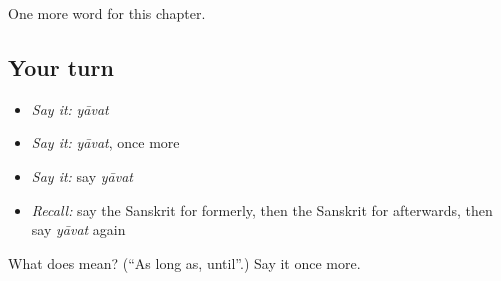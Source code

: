 \begin{grammarlens}[title={What you've built}]
One more word for this chapter.
\end{grammarlens}

\subsection*{Your turn}
\begin{itemize}
\raggedright
  \item \emph{Say it:} \emph{yāvat}
  \item \emph{Say it:} \emph{yāvat}, once more
  \item \emph{Say it:} say \emph{yāvat}
  \item \emph{Recall:} say the Sanskrit for formerly, then the Sanskrit for afterwards, then say \emph{yāvat} again
\end{itemize}

\begin{tcolorbox}[breakable,colback=teal!4,colframe=teal!35!black,title={Before you move on}]
What does  mean? (\textquotedblleft{}As long as, until\textquotedblright{}.) Say it once more.
\end{tcolorbox}
